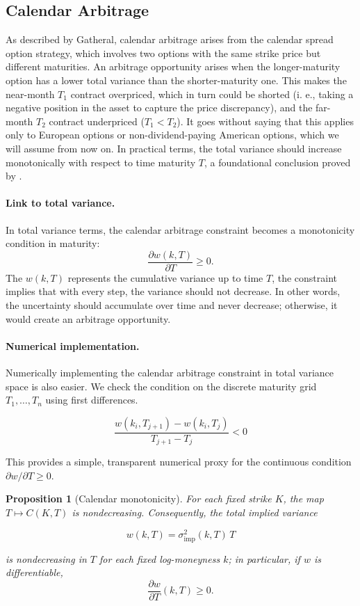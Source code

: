 \documentclass[12pt,oneside]{report}
\newtheorem{proposition}[theorem]{Proposition}
\theoremstyle{definition}
\theoremstyle{remark}
\begin{document}
\subsection{Calendar Arbitrage}
\label{subsubsec:calendar-arbitrage}

As described by Gatheral, calendar arbitrage arises from the calendar spread option strategy, which involves two options with the same strike price but different maturities. An arbitrage opportunity arises when the longer-maturity option has a lower total variance than the shorter-maturity one. This makes the near-month $T_1$ contract overpriced, which in turn could be shorted (i. e., taking a negative position in the asset to capture the price discrepancy), and the far-month $T_2$ contract underpriced ($T_1 < T_2$). It goes without saying that this applies only to European options or non-dividend-paying American options, which we will assume from now on. In practical terms, the total variance should increase monotonically with respect to time maturity $T$, a foundational conclusion proved by \citet{gatheral2006volatility}. 

\paragraph{Link to total variance.}
In total variance terms, the calendar arbitrage constraint becomes a monotonicity condition in maturity:
\[\frac{\partial w(k,T)}{\partial T} \geq 0.\]
The $w(k,T)$ represents the cumulative variance up to time $T$, the constraint implies that with every step, the variance should not decrease. In other words, the uncertainty should accumulate over time and never decrease; otherwise, it would create an arbitrage opportunity.

\paragraph{Numerical implementation.}
Numerically implementing the calendar arbitrage constraint in total variance space is also easier. We check the condition on the discrete maturity grid $T_1, \dots, T_n$ using first differences. 

\[\frac{w(k_i,T_{j+1}) - w(k_i,T_j)}{T_{j+1} - T_j} < 0\]

This provides a simple, transparent numerical proxy for the continuous condition $\partial w/\partial T \geq 0$.

\begin{proposition}[Calendar monotonicity]
For each fixed strike \(K\), the map \(T\mapsto C(K,T)\) is nondecreasing. Consequently, the total implied variance

\[w(k,T)=\sigma_{\mathrm{imp}}^2(k,T)\,T\]

is nondecreasing in \(T\) for each fixed log-moneyness \(k\); in particular, if \(w\) is differentiable,
\[\frac{\partial w}{\partial T}(k,T) \geq 0.\]
\end{proposition}
\end{document}
